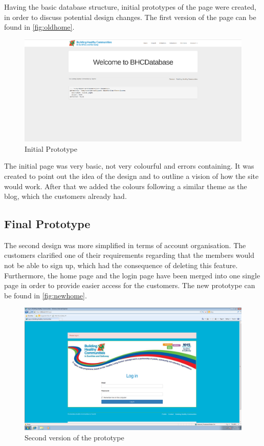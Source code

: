 \documentclass{l3proj}
\begin{document}
Having the basic database structure, initial prototypes of the page were created, in order to discuss potential design changes. The first version of the page can be found in \autoref{fig:oldhome}.

\begin{figure}[h]
\centerline{\includegraphics[width=\textwidth, height=\textheight, keepaspectratio]{oldhome.png}}
\caption{Initial Prototype}
\label{fig:oldhome}
\end{figure}

The initial page was very basic, not very colourful and errors containing. It was created to point out the idea of the design and to outline a vision of how the site would work. After that we added the colours following a similar theme as the blog, which the customers already had.

\subsection{Final Prototype}
\label{sec:prototype2}

The second design was more simplified in terms of account organisation. The customers clarified one of their requirements regarding that the members would not be able to sign up, which had the consequence of deleting this feature. Furthermore, the home page and the login page have been merged into one single page in order to provide easier access for the customers. The new prototype can be found in \autoref{fig:newhome}.

\begin{figure}[h]
\centerline{\includegraphics[width=\textwidth, height=\textheight, keepaspectratio]{newhome.png}}
\caption{Second version of the prototype}
\label{fig:newhome}
\end{figure}
\end{document}
